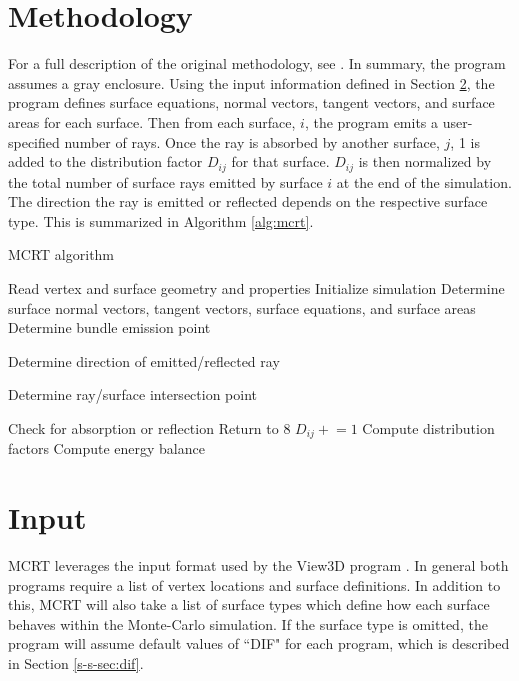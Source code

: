 \documentclass{article}
\begin{document}
\section{Methodology}
\label{sec:method}

For a full description of the original methodology, see \cite{Nigusse2004}. In summary, the program assumes a gray enclosure. Using the input information defined in Section \ref{sec:input}, the program defines surface equations, normal vectors, tangent vectors, and surface areas for each surface. Then from each surface, $i$, the program emits a user-specified number of rays. Once the ray is absorbed by another surface, $j$, 1 is added to the distribution factor $D_{ij}$ for that surface. $D_{ij}$ is then normalized by the total number of surface rays emitted by surface $i$ at the end of the simulation. The direction the ray is emitted or reflected depends on the respective surface type. This is summarized in Algorithm \ref{alg:mcrt}.

\begin{algorithm}
\caption{MCRT algorithm}
\label{alg:mcrt}
\begin{algorithmic}[1]
\State Read vertex and surface geometry and properties
\State Initialize simulation
\State Determine surface normal vectors, tangent vectors, surface equations, and surface areas
\State Determine bundle emission point

\State Determine direction of emitted/reflected ray

\State Determine ray/surface intersection point

\State Check for absorption or reflection
\State Return to 8
\Else
\State $D_{ij} \mathrel{+}= 1$ 
\EndIf
\EndFor
\EndFor
\State Compute distribution factors
\State Compute energy balance
\EndProcedure
\end{algorithmic}
\end{algorithm}

\section{Input}
\label{sec:input}

MCRT leverages the input format used by the View3D program \citep{Walton2002}. In general both  programs require a list of vertex locations and surface definitions. In addition to this, MCRT will also take a list of surface types which define how each surface behaves within the Monte-Carlo simulation. If the surface type is omitted, the program will assume default values of ``DIF" for each program, which is described in Section \ref{s-s-sec:dif}.
\end{document}

